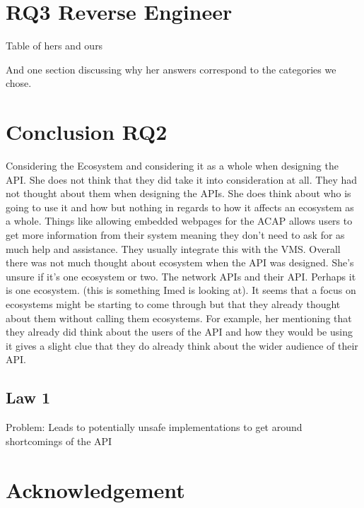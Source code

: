 \documentclass[conference]{IEEEtran}
\begin{document}
\section{RQ3 Reverse Engineer}
Table of hers and ours

And one section discussing why her answers correspond to the categories we chose.





\section{Conclusion RQ2} \label{conclusion}







Considering the Ecosystem and considering it as a whole when designing the API. She does not think that they did take it into consideration at all. They had not thought about them when designing the APIs. She does think about who is going to use it and how but nothing in regards to how it affects an ecosystem as a whole. Things like allowing embedded webpages for the ACAP allows users to get more information from their system meaning they don’t need to ask for as much help and assistance. They usually integrate this with the VMS. Overall there was not much thought about ecosystem when the API was designed. She’s unsure if it’s one ecosystem or two. The network APIs and their API. Perhaps it is one ecosystem. (this is something Imed is looking at).
It seems that a focus on ecosystems might be starting to come through but that they already thought about them without calling them ecosystems. For example, her mentioning that they already did think about the users of the API and how they would be using it gives a slight clue that they do already think about the wider audience of their API.





\subsection{Law 1}

Problem: Leads to potentially unsafe implementations to get around shortcomings of the API

\section*{Acknowledgement} \label{acknowledgement}




\end{document}
